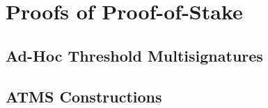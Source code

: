 \chapter{Proofs of Proof-of-Stake}\label{chapter:stake}

\section{Ad-Hoc Threshold Multisignatures}
\section{ATMS Constructions}
